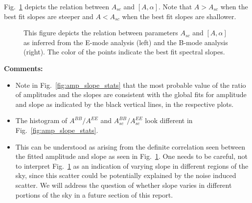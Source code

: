 \documentclass[12pt]{article}
\begin{document}
Fig.~\ref{fig:amp_vs_ampsc} depicts the relation between $A_{sc}$ and $[A,\alpha]$. Note that $A > A_{sc}$ when the best fit slopes are steeper and $A < A_{sc}$ when the best fit slopes are shallower. 
\begin{figure}[!h]
\centering
{}
\caption{This figure depicts the relation between parameters $A_{sc}$ and $[A,\alpha]$ as inferred from the E-mode analysis (left) and the B-mode analysis (right). The color of the points indicate the best fit spectral slopes.}
\label{fig:amp_vs_ampsc}
\end{figure}

{\bf Comments:}
\begin{itemize}
\item Note in Fig.~\ref{fig:amp_slope_stats} that the most probable value of the ratio of amplitudes and the slopes are consistent with the global fits for amplitude and slope as indicated by the black vertical lines, in the respective plots.
\item The histogram of $A^{BB}/A^{EE}$ and $A^{BB}_{sc}/A^{EE}_{sc}$ look different in Fig.~\ref{fig:amp_slope_stats}.
\item This can be understood as arising from the definite correlation seen between the fitted amplitude and slope as seen in Fig.~\ref{fig:amp_vs_ampsc}. One needs to be careful, not to interpret Fig.~\ref{fig:amp_vs_ampsc} as an indication of varying slope in different regions of the sky, since this scatter could be potentially explained by the noise induced scatter. We will address the question of whether slope varies in different portions of the sky in a future section of this report.
\end{itemize}
\end{document}
